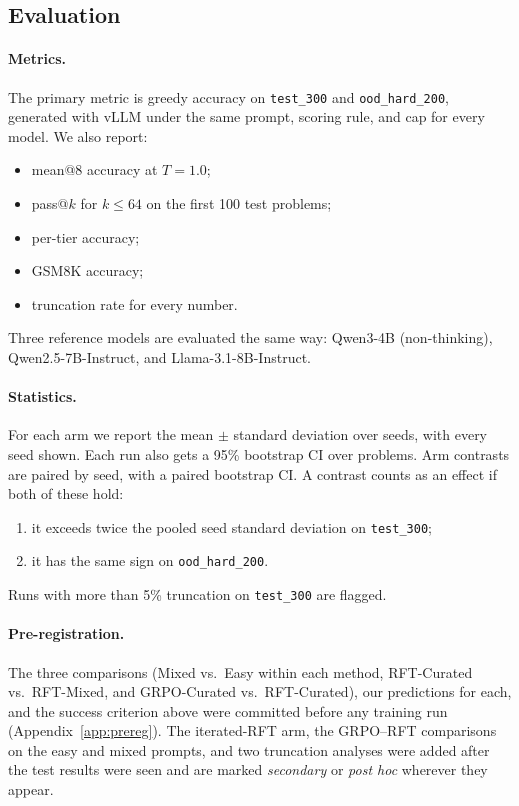 \documentclass{article}
\begin{document}
\subsection{Evaluation}
\label{sec:eval}

\paragraph{Metrics.} The primary metric is greedy accuracy on \texttt{test\_300} and \texttt{ood\_hard\_200}, generated with vLLM under the same prompt, scoring rule, and cap for every model. We also report:
\begin{itemize}
  \item mean@8 accuracy at $T{=}1.0$;
  \item pass@$k$ for $k \leq 64$ on the first 100 test problems;
  \item per-tier accuracy;
  \item GSM8K accuracy;
  \item truncation rate for every number.
\end{itemize}
Three reference models are evaluated the same way: Qwen3-4B (non-thinking), Qwen2.5-7B-Instruct, and Llama-3.1-8B-Instruct.

\paragraph{Statistics.} For each arm we report the mean $\pm$ standard deviation over seeds, with every seed shown. Each run also gets a 95\% bootstrap CI over problems. Arm contrasts are paired by seed, with a paired bootstrap CI. A contrast counts as an effect if both of these hold:
\begin{enumerate}
  \item it exceeds twice the pooled seed standard deviation on \texttt{test\_300};
  \item it has the same sign on \texttt{ood\_hard\_200}.
\end{enumerate}
Runs with more than 5\% truncation on \texttt{test\_300} are flagged.

\paragraph{Pre-registration.} The three comparisons (Mixed vs.\ Easy within each method, RFT-Curated vs.\ RFT-Mixed, and GRPO-Curated vs.\ RFT-Curated), our predictions for each, and the success criterion above were committed before any training run (Appendix~\ref{app:prereg}). The iterated-RFT arm, the GRPO--RFT comparisons on the easy and mixed prompts, and two truncation analyses were added after the test results were seen and are marked \emph{secondary} or \emph{post hoc} wherever they appear.
\end{document}
